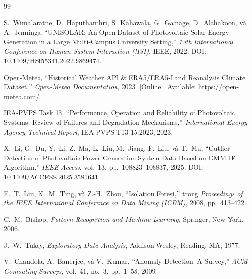 \documentclass[12pt, a4paper]{report}
\begin{document}
\newpage

\begin{thebibliography}{99}

S.~Wimalaratne, D.~Haputhanthri, S.~Kahawala, G.~Gamage, D.~Alahakoon, và A.~Jennings,
\newblock ``UNISOLAR: An Open Dataset of Photovoltaic Solar Energy Generation in a Large Multi-Campus University Setting,''
\newblock \textit{15th International Conference on Human System Interaction (HSI)}, IEEE, 2022.
\newblock DOI: \href{https://doi.org/10.1109/HSI55341.2022.9869474}{10.1109/HSI55341.2022.9869474}.

Open-Meteo,
\newblock ``Historical Weather API \& ERA5/ERA5-Land Reanalysis Climate Dataset,''
\newblock \textit{Open-Meteo Documentation}, 2023. [Online]. Available: \url{https://open-meteo.com/}.

IEA-PVPS Task 13,
\newblock ``Performance, Operation and Reliability of Photovoltaic Systems: Review of Failures and Degradation Mechanisms,''
\newblock \textit{International Energy Agency Technical Report}, IEA-PVPS T13-15:2023, 2023.

X.~Li, G.~Du, Y.~Li, Z.~Ma, L.~Liu, M.~Jiang, F.~Liu, và T.~Mu,
\newblock ``Outlier Detection of Photovoltaic Power Generation System Data Based on GMM-IF Algorithm,''
\newblock \textit{IEEE Access}, vol.~13, pp.~108823--108837, 2025.
\newblock DOI: \href{https://doi.org/10.1109/ACCESS.2025.3581641}{10.1109/ACCESS.2025.3581641}.

F.~T.~Liu, K.~M.~Ting, và Z.-H.~Zhou,
\newblock ``Isolation Forest,''
\newblock trong \textit{Proceedings of the IEEE International Conference on Data Mining (ICDM)}, 2008, pp.~413--422.

C.~M.~Bishop,
\newblock \textit{Pattern Recognition and Machine Learning},
\newblock Springer, New York, 2006.

J.~W.~Tukey,
\newblock \textit{Exploratory Data Analysis},
\newblock Addison-Wesley, Reading, MA, 1977.

V.~Chandola, A.~Banerjee, và V.~Kumar,
\newblock ``Anomaly Detection: A Survey,''
\newblock \textit{ACM Computing Surveys}, vol.~41, no.~3, pp.~1--58, 2009.


\end{thebibliography}
\end{document}
